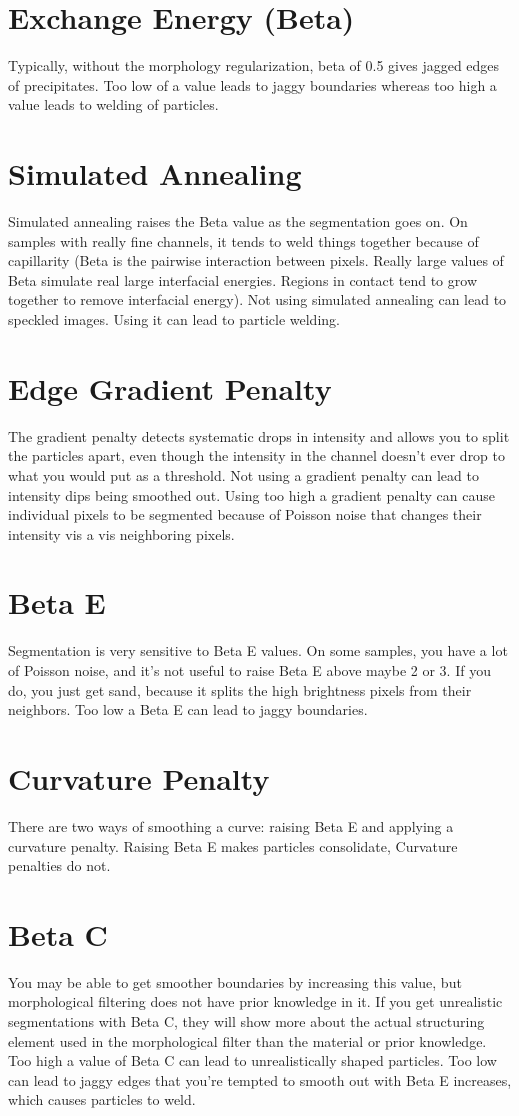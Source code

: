 \documentclass[12pt,oneside]{book}
\begin{document}
\section{Exchange Energy (Beta)}
Typically, without the morphology regularization, beta of 0.5 gives jagged edges of precipitates. Too low of a value leads to jaggy boundaries whereas too high a value leads to welding of particles.
\section{Simulated Annealing}
Simulated annealing raises the Beta value as the segmentation goes on. On samples with really fine channels, it tends to weld things together because of capillarity (Beta is the pairwise interaction between pixels. Really large values of Beta simulate real large interfacial energies. Regions in contact tend to grow together to remove interfacial energy). Not using simulated annealing can lead to speckled images. Using it can lead to particle welding.
\section{Edge Gradient Penalty}
The gradient penalty detects systematic drops in intensity and allows you to split the particles apart, even though the intensity in the channel doesn't ever drop to what you would put as a threshold. Not using a gradient penalty can lead to intensity dips being smoothed out. Using too high a gradient penalty can cause individual pixels to be segmented because of Poisson noise that changes their intensity vis a vis neighboring pixels.
\section{Beta E}
Segmentation is very sensitive to Beta E values. On some samples, you have a lot of Poisson noise, and it's not useful to raise Beta E above maybe 2 or 3. If you do, you just get sand, because it splits the high brightness pixels from their neighbors. Too low a Beta E can lead to jaggy boundaries.
\section{Curvature Penalty}
There are two ways of smoothing a curve: raising Beta E and applying a curvature penalty. Raising Beta E makes particles consolidate, Curvature penalties do not.
\section{Beta C}
You may be able to get smoother boundaries by increasing this value, but morphological filtering does not have prior knowledge in it. If you get unrealistic segmentations with Beta C, they will show more about the actual structuring element used in the morphological filter than the material or prior knowledge. Too high a value of Beta C can lead to unrealistically shaped particles. Too low can lead to jaggy edges that you're tempted to smooth out with Beta E increases, which causes particles to weld.
\end{document}
